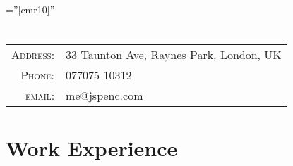 \documentclass[a4paper,10pt]{article} %
\begin{document}
\pagestyle{empty} %

\font\fb=''[cmr10]'' %


\par{\bigskip\par} %

\section{}

\begin{tabular}{rl}
\textsc{Address:} & 33 Taunton Ave, Raynes Park, London, UK \\
\textsc{Phone:} & 077075 10312\\
\textsc{email:} & \href{mailto:me@jspenc.com}{me@jspenc.com}
\end{tabular}


\section{Work Experience}
\end{document}
